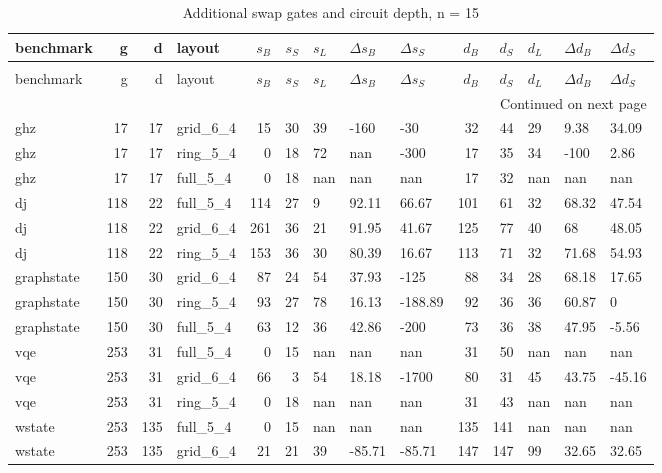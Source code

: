 \begin{longtable}{lrrlrrlllrrlll}
\caption{Additional swap gates and circuit depth, n = 15} \label{benchmark-table-15} \\
\toprule
benchmark & g & d & layout & $s_B$ & $s_S$ & $s_L$ & $\Delta s_B$ & $\Delta s_S$ & $d_B$ & $d_S$ & $d_L$ & $\Delta d_B$ & $\Delta d_S$ \\
\midrule
\endfirsthead
\caption[]{Additional swap gates and circuit depth, n = 15} \\
\toprule
benchmark & g & d & layout & $s_B$ & $s_S$ & $s_L$ & $\Delta s_B$ & $\Delta s_S$ & $d_B$ & $d_S$ & $d_L$ & $\Delta d_B$ & $\Delta d_S$ \\
\midrule
\endhead
\midrule
\multicolumn{14}{r}{Continued on next page} \\
\midrule
\endfoot
\bottomrule
\endlastfoot
ghz & 17 & 17 & grid\_6\_4 & 15 & 30 & 39 & -160 & -30 & 32 & 44 & 29 & 9.38 & 34.09 \\
ghz & 17 & 17 & ring\_5\_4 & 0 & 18 & 72 & nan & -300 & 17 & 35 & 34 & -100 & 2.86 \\
ghz & 17 & 17 & full\_5\_4 & 0 & 18 & nan & nan & nan & 17 & 32 & nan & nan & nan \\
dj & 118 & 22 & full\_5\_4 & 114 & 27 & 9 & 92.11 & 66.67 & 101 & 61 & 32 & 68.32 & 47.54 \\
dj & 118 & 22 & grid\_6\_4 & 261 & 36 & 21 & 91.95 & 41.67 & 125 & 77 & 40 & 68 & 48.05 \\
dj & 118 & 22 & ring\_5\_4 & 153 & 36 & 30 & 80.39 & 16.67 & 113 & 71 & 32 & 71.68 & 54.93 \\
graphstate & 150 & 30 & grid\_6\_4 & 87 & 24 & 54 & 37.93 & -125 & 88 & 34 & 28 & 68.18 & 17.65 \\
graphstate & 150 & 30 & ring\_5\_4 & 93 & 27 & 78 & 16.13 & -188.89 & 92 & 36 & 36 & 60.87 & 0 \\
graphstate & 150 & 30 & full\_5\_4 & 63 & 12 & 36 & 42.86 & -200 & 73 & 36 & 38 & 47.95 & -5.56 \\
vqe & 253 & 31 & full\_5\_4 & 0 & 15 & nan & nan & nan & 31 & 50 & nan & nan & nan \\
vqe & 253 & 31 & grid\_6\_4 & 66 & 3 & 54 & 18.18 & -1700 & 80 & 31 & 45 & 43.75 & -45.16 \\
vqe & 253 & 31 & ring\_5\_4 & 0 & 18 & nan & nan & nan & 31 & 43 & nan & nan & nan \\
wstate & 253 & 135 & full\_5\_4 & 0 & 15 & nan & nan & nan & 135 & 141 & nan & nan & nan \\
wstate & 253 & 135 & grid\_6\_4 & 21 & 21 & 39 & -85.71 & -85.71 & 147 & 147 & 99 & 32.65 & 32.65 \\

\end{longtable}
